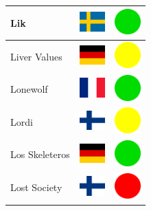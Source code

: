 \documentclass[12pt, a4paper, twoside]{report}
\begin{document}
\begin{center}
\begin{longtable}{|p{5cm}|p{2cm}|p{2cm}|}
Lik & \includegraphics[width=1cm]{4x3/se} & \includegraphics[width=1cm]{likes/y} \\ \hline
Liver Values & \includegraphics[width=1cm]{4x3/de} & \includegraphics[width=1cm]{likes/m} \\ \hline
Lonewolf & \includegraphics[width=1cm]{4x3/fr} & \includegraphics[width=1cm]{likes/y} \\ \hline
Lordi & \includegraphics[width=1cm]{4x3/fi} & \includegraphics[width=1cm]{likes/m} \\ \hline
Los Skeleteros & \includegraphics[width=1cm]{4x3/de} & \includegraphics[width=1cm]{likes/y} \\ \hline
Lost Society & \includegraphics[width=1cm]{4x3/fi} & \includegraphics[width=1cm]{likes/n} \\ \hline

\end{longtable}
\end{center}
\end{document}
